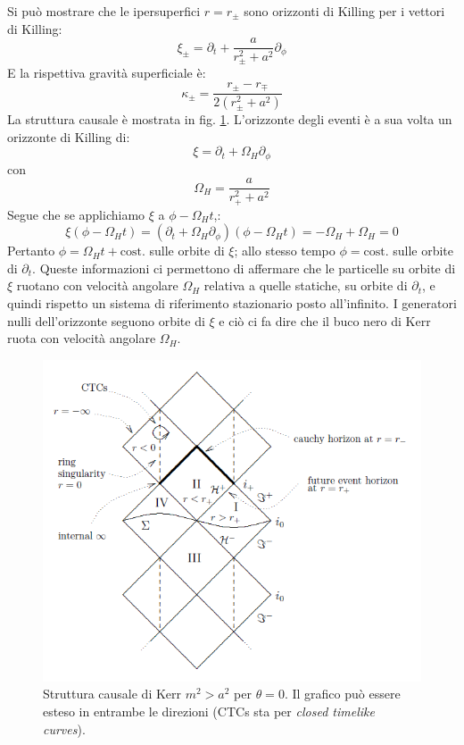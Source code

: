 Si può mostrare che le ipersuperfici $r = r_\pm$ sono orizzonti di Killing per i vettori di Killing:
\begin{equation*}
    \xi_\pm = \partial_t + \frac{a}{r^2_\pm + a^2} \partial_\phi
\end{equation*}
E la rispettiva gravità superficiale è:
\begin{equation}
    \kappa_\pm =\frac{r_\pm - r_\mp}{2(r^2_\pm + a^2)}
\label{eq.grav_sup_kerr}
\end{equation}
La struttura causale è mostrata in fig. \ref{fig.kerr_causale_2}.
L'orizzonte degli eventi è a sua volta un orizzonte di Killing di:
\begin{equation*}
    \xi = \partial_t + \Omega_H \partial_\phi
\end{equation*}
con
\begin{equation}
    \Omega_H = \frac{a}{r^2_+ + a^2}
    \label{eq.omega_kerr}
\end{equation}
Segue che se applichiamo $\xi$ a $\phi - \Omega_H t$,:
\begin{equation*}
    \xi(\phi - \Omega_H t) = (\partial_t + \Omega_H \partial_\phi) (\phi - \Omega_H t) = - \Omega_H + \Omega_H = 0
\end{equation*}
Pertanto $\phi = \Omega_H t + \textrm{cost.}$ sulle orbite di $\xi$; allo stesso tempo $\phi = \textrm{cost.}$ sulle orbite di $\partial_t$. Queste informazioni ci permettono di affermare che le particelle su orbite di $\xi$ ruotano con velocità angolare $\Omega_H$ relativa a quelle statiche, su orbite di $\partial_t$, e quindi rispetto un sistema di riferimento stazionario posto all'infinito.
I generatori nulli dell'orizzonte seguono orbite di $\xi$ e ciò ci fa dire che il buco nero di Kerr ruota con velocità angolare $\Omega_H$.
\begin{figure}
    \centering
    \includegraphics[scale=0.7]{immagini/kerr_causale_2.png}
    \caption{Struttura causale di Kerr $m^2 > a^2$ per $\theta = 0$. Il grafico può essere esteso in entrambe le direzioni (CTCs sta per \textit{closed timelike curves}).}
    \label{fig.kerr_causale_2}
\end{figure}
